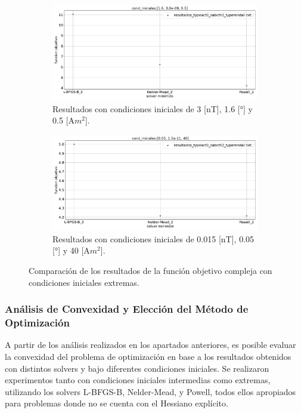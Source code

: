 \begin{figure}[h!]
	\centering
	\begin{subfigure}[b]{0.8\textwidth}
		\centering
		\includegraphics[width=\textwidth]{cond_iniciales_1.6_3.0e-9_0.5.pdf}
		\caption{Resultados con condiciones iniciales de 3 [nT], 1.6 [°] y 0.5 [A$m^2$].}
		\label{fig:all_cond_inic_3}
	\end{subfigure}
	\hfill
	\begin{subfigure}[b]{0.8\textwidth}
		\centering
		\includegraphics[width=\textwidth]{cond_iniciales_0.05_1.5e-11_40.pdf}
		\caption{Resultados con condiciones iniciales de 0.015 [nT], 0.05 [°] y 40 [A$m^2$].}
		\label{fig:all_cond_inic_4}
	\end{subfigure}
	\caption{Comparación de los resultados de la función objetivo compleja con condiciones iniciales extremas.}
	\label{fig:cond_iniciales_comparacion_2}
\end{figure}

\subsubsection{Análisis de Convexidad y Elección del Método de Optimización}

A partir de los análisis realizados en los apartados anteriores, es posible evaluar la convexidad del problema de optimización en base a los resultados obtenidos con distintos solvers y bajo diferentes condiciones iniciales. Se realizaron experimentos tanto con condiciones iniciales intermedias como extremas, utilizando los solvers L-BFGS-B, Nelder-Mead, y Powell, todos ellos apropiados para problemas donde no se cuenta con el Hessiano explícito.

